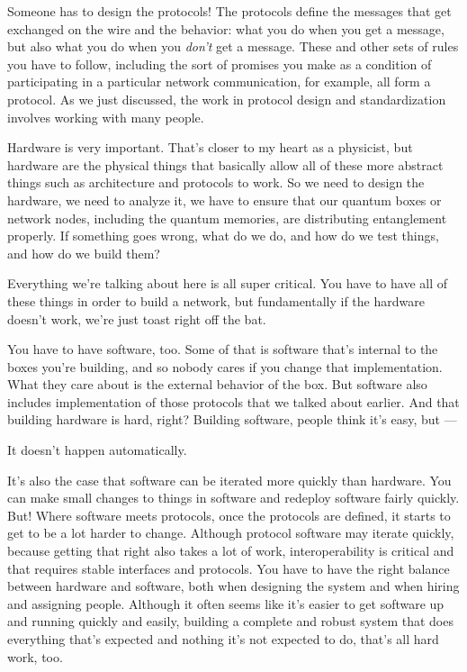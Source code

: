 Someone has to design the protocols! The protocols define the messages that get exchanged on the wire and the behavior: what you do when you get a message, but also what you do when you \emph{don't} get a message. These and other sets of rules you have to follow, including the sort of promises you make as a condition of participating in a particular network communication, for example, all form a protocol.  As we just discussed, the work in protocol design and standardization involves working with many people.

\mmm Hardware is very important. That's closer to my heart as a physicist, but hardware are the physical things that basically allow all of these more abstract things such as architecture and protocols to work. So we need to design the hardware, we need to analyze it, we have to ensure that our quantum boxes or network nodes, including the quantum memories, are distributing entanglement properly. If something goes wrong, what do we do, and how do we test things, and how do we build them?

\rrr Everything we're talking about here is all super critical. You have to have all of these things in order to build a network, but fundamentally if the hardware doesn't work, we're just toast right off the bat.

You have to have software, too. Some of that is software that's internal to the boxes you're building, and so nobody cares if you change that implementation. What they care about is the external behavior of the box. But software also includes implementation of those protocols that we talked about earlier. And that building hardware is hard, right? Building software, people think it's easy, but ---

\mmm It doesn't happen automatically.

\rrr It's also the case that software can be iterated more quickly than hardware. You can make small changes to things in software and redeploy software fairly quickly. But! Where software meets protocols, once the protocols are defined, it starts to get to be a lot harder to change. Although protocol software may iterate quickly, because getting that right also takes a lot of work, interoperability is critical and that requires stable interfaces and protocols. You have to have the right balance between hardware and software, both when designing the system and when hiring and assigning people. Although it often seems like it's easier to get software up and running quickly and easily, building a complete and robust system that does everything that's expected and nothing it's not expected to do, that's all hard work, too.

